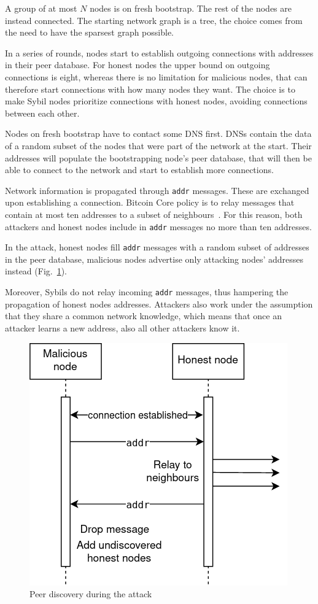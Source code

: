 \documentclass[12pt, letterpaper, twoside]{article}
\begin{document}
A group of at most $N$ nodes is on fresh bootstrap. The rest of the nodes are instead connected. The starting network graph is a tree, the choice comes from the need to have the sparsest graph possible.

In a series of rounds, nodes start to establish outgoing connections with addresses in their peer database. For honest nodes the upper bound on outgoing connections is eight, whereas there is no limitation for malicious nodes, that can therefore start connections with how many nodes they want. The choice is to make Sybil nodes prioritize connections with honest nodes, avoiding connections between each other.

Nodes on fresh bootstrap have to contact some DNS first. DNSs contain the data of a random subset of the nodes that were part of the network at the start. Their addresses will populate the bootstrapping node's peer database, that will then be able to connect to the network and start to establish more connections.

Network information is propagated through \texttt{addr} messages. These are exchanged upon establishing a connection. Bitcoin Core policy is to relay messages that contain at most ten addresses to a subset of neighbours~\cite{btccode}. For this reason, both attackers and honest nodes include in \texttt{addr} messages no more than ten addresses.

In the attack, honest nodes fill \texttt{addr} messages with a random subset of addresses in the peer database, malicious nodes advertise only attacking nodes' addresses instead (Fig.~\ref{fig:atkadrr}).

Moreover, Sybils do not relay incoming \texttt{addr} messages, thus hampering the propagation of honest nodes addresses. Attackers also work under the assumption that they share a common network knowledge, which means that once an attacker learns a new address, also all other attackers know it.

\begin{figure}[h!]
	\includegraphics[width=.5\textwidth]{pict/atkaddr.png}
	\centering
	\caption{Peer discovery during the attack}
	\label{fig:atkadrr}
\end{figure}
\end{document}

